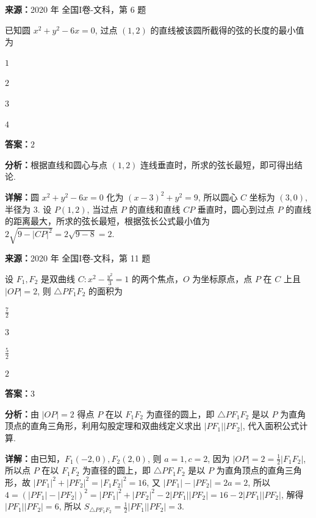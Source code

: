 \begin{question}[points=5]
\textbf{来源：}2020 年 全国I卷-文科，第 6 题\par
已知圆 $x^2 + y^2 - 6x = 0$, 过点 $(1,2)$ 的直线被该圆所截得的弦的长度的最小值为
\begin{choices}
  \item $1$
  \item $2$
  \item $3$
  \item $4$
\end{choices}
\begin{solution}
\textbf{答案：}$2$

\textbf{分析：}根据直线和圆心与点 $(1,2)$ 连线垂直时，所求的弦长最短，即可得出结论.

\textbf{详解：}圆 $x^2 + y^2 - 6x = 0$ 化为 $(x-3)^2 + y^2 = 9$, 所以圆心 $C$ 坐标为 $(3,0)$, 半径为 $3$. 设 $P(1,2)$, 当过点 $P$ 的直线和直线 $CP$ 垂直时，圆心到过点 $P$ 的直线的距离最大，所求的弦长最短，根据弦长公式最小值为 $2\sqrt{9 - |CP|^2} = 2\sqrt{9 - 8} = 2$.
\end{solution}
\end{question}

\begin{question}[points=5]
\textbf{来源：}2020 年 全国I卷-文科，第 11 题\par
设 $F_1, F_2$ 是双曲线 $C: x^2 - \frac{y^2}{3} = 1$ 的两个焦点，$O$ 为坐标原点，点 $P$ 在 $C$ 上且 $|OP| = 2$, 则 $\triangle PF_1F_2$ 的面积为
\begin{choices}
  \item $\frac{7}{2}$
  \item $3$
  \item $\frac{5}{2}$
  \item $2$
\end{choices}
\begin{solution}
\textbf{答案：}$3$

\textbf{分析：}由 $|OP| = 2$ 得点 $P$ 在以 $F_1F_2$ 为直径的圆上，即 $\triangle PF_1F_2$ 是以 $P$ 为直角顶点的直角三角形，利用勾股定理和双曲线定义求出 $|PF_1||PF_2|$, 代入面积公式计算.

\textbf{详解：}由已知，$F_1(-2,0), F_2(2,0)$, 则 $a=1, c=2$, 因为 $|OP|=2 = \frac{1}{2}|F_1F_2|$, 所以点 $P$ 在以 $F_1F_2$ 为直径的圆上，即 $\triangle PF_1F_2$ 是以 $P$ 为直角顶点的直角三角形，故 $|PF_1|^2 + |PF_2|^2 = |F_1F_2|^2 = 16$, 又 $|PF_1|-|PF_2|=2a=2$, 所以 $4 = (|PF_1|-|PF_2|)^2 = |PF_1|^2 + |PF_2|^2 - 2|PF_1||PF_2| = 16 - 2|PF_1||PF_2|$, 解得 $|PF_1||PF_2|=6$, 所以 $S_{\triangle PF_1F_2} = \frac{1}{2}|PF_1||PF_2|=3$.
\end{solution}
\end{question}

